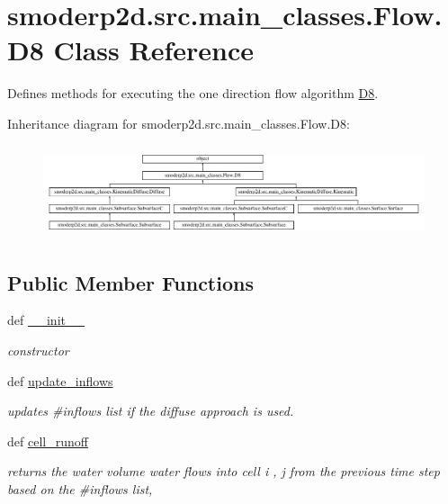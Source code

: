 \hypertarget{classsmoderp2d_1_1src_1_1main__classes_1_1Flow_1_1D8}{\section{smoderp2d.\-src.\-main\-\_\-classes.\-Flow.\-D8 Class Reference}
\label{classsmoderp2d_1_1src_1_1main__classes_1_1Flow_1_1D8}
}


Defines methods for executing the one direction flow algorithm \hyperlink{classsmoderp2d_1_1src_1_1main__classes_1_1Flow_1_1D8}{D8}.  


Inheritance diagram for smoderp2d.\-src.\-main\-\_\-classes.\-Flow.\-D8\-:\begin{figure}[H]
\begin{center}
\leavevmode
\includegraphics[height=2.753196cm]{da/d29/classsmoderp2d_1_1src_1_1main__classes_1_1Flow_1_1D8}
\end{center}
\end{figure}
\subsection*{Public Member Functions}
\begin{DoxyCompactItemize}
\item 
def \hyperlink{classsmoderp2d_1_1src_1_1main__classes_1_1Flow_1_1D8_a67744c5c6a4fe44565c0bdd52f513413}{\-\_\-\-\_\-init\-\_\-\-\_\-}
\begin{DoxyCompactList}\small\item\em constructor \end{DoxyCompactList}\item 
def \hyperlink{classsmoderp2d_1_1src_1_1main__classes_1_1Flow_1_1D8_a2c6113c6519048d1cd03869a270fad2e}{update\-\_\-inflows}
\begin{DoxyCompactList}\small\item\em updates \#inflows list if the diffuse approach is used. \end{DoxyCompactList}\item 
def \hyperlink{classsmoderp2d_1_1src_1_1main__classes_1_1Flow_1_1D8_a0a85901450ca94f202da3a609b4797eb}{cell\-\_\-runoff}
\begin{DoxyCompactList}\small\item\em returns the water volume water flows into cell i , j from the previous time step based on the \#inflows list, \par
\end{DoxyCompactList}\end{DoxyCompactItemize}
